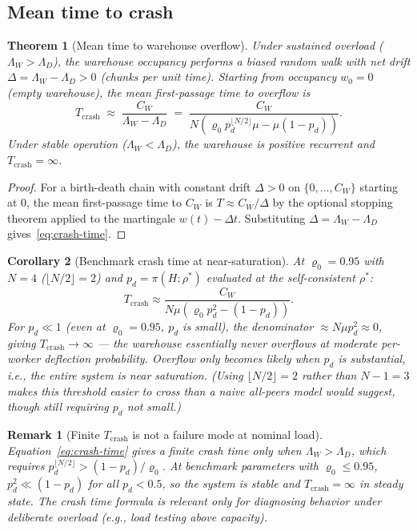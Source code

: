 \documentclass[11pt,a4paper]{report}
\newtheorem{theorem}{Theorem}[section]
\newtheorem{corollary}[theorem]{Corollary}
\newtheorem{remark}{Remark}[section]
\newcommand{\rhostar}{\rho^{*}}
\newcommand{\rhozero}{\varrho_0}
\newcommand{\pd}{p_d}
\begin{document}
\subsection{Mean time to crash}

\begin{theorem}[Mean time to warehouse overflow]
\label{thm:crash-time}
Under sustained overload ($\Lambda_W > \Lambda_D$), the warehouse
occupancy performs a biased random walk with net drift
$\Delta = \Lambda_W - \Lambda_D > 0$ (chunks per unit time).
Starting from occupancy $w_0 = 0$ (empty warehouse),
the mean first-passage time to overflow is
\begin{equation}
  T_{\mathrm{crash}}
  \;\approx\; \frac{C_W}{\Lambda_W - \Lambda_D}
  \;=\; \frac{C_W}{N(\rhozero\pd^{\lfloor N/2\rfloor}\mu - \mu(1-\pd))}.
  \label{eq:crash-time}
\end{equation}
Under stable operation ($\Lambda_W < \Lambda_D$), the warehouse is
positive recurrent and $T_{\mathrm{crash}} = \infty$.
\end{theorem}

\begin{proof}
For a birth-death chain with constant drift $\Delta > 0$ on
$\{0,\ldots,C_W\}$ starting at 0, the mean first-passage time
to $C_W$ is $T \approx C_W/\Delta$ by the optional stopping theorem
applied to the martingale $w(t) - \Delta t$.
Substituting $\Delta = \Lambda_W - \Lambda_D$ gives~\eqref{eq:crash-time}.
\end{proof}

\begin{corollary}[Benchmark crash time at near-saturation]
At $\rhozero = 0.95$ with $N=4$ ($\lfloor N/2\rfloor = 2$) and
$\pd = \pi(H;\rhostar)$ evaluated at the self-consistent $\rhostar$:
\[
  T_{\mathrm{crash}} \approx \frac{C_W}{N\mu(\rhozero\pd^2 - (1-\pd))}.
\]
For $\pd \ll 1$ (even at $\rhozero = 0.95$, $\pd$ is small),
the denominator $\approx N\mu\pd^2 \approx 0$, giving
$T_{\mathrm{crash}} \to \infty$ --- the warehouse essentially never overflows
at moderate per-worker deflection probability.
Overflow only becomes likely when $\pd$ is substantial, i.e., the entire
system is near saturation. (Using $\lfloor N/2\rfloor=2$ rather than $N-1=3$
makes this threshold easier to cross than a naive all-peers model would
suggest, though still requiring $\pd$ not small.)
\end{corollary}

\begin{remark}[Finite $T_{\mathrm{crash}}$ is not a failure mode at nominal load]
Equation~\eqref{eq:crash-time} gives a finite crash time only when
$\Lambda_W > \Lambda_D$, which requires $\pd^{\lfloor N/2\rfloor} > (1-\pd)/\rhozero$.
At benchmark parameters with $\rhozero \leq 0.95$, $\pd^2 \ll (1-\pd)$
for all $\pd < 0.5$, so the system is stable and $T_{\mathrm{crash}} = \infty$
in steady state.
The crash time formula is relevant only for diagnosing behavior under
deliberate overload (e.g., load testing above capacity).
\end{remark}
\end{document}
